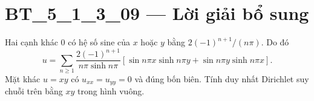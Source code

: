 \documentclass[10pt,a4paper]{article}
\begin{document}
\section*{BT\_5\_1\_3\_09 — Lời giải bổ sung}
Hai cạnh khác 0 có hệ số sine của $x$ hoặc $y$ bằng $2(-1)^{n+1}/(n\pi)$. Do đó
\[u=\sum_{n\ge1}\frac{2(-1)^{n+1}}{n\pi\sinh n\pi}[\sin n\pi x\sinh n\pi y+\sin n\pi y\sinh n\pi x].\]
Mặt khác $u=xy$ có $u_{xx}=u_{yy}=0$ và đúng bốn biên. Tính duy nhất Dirichlet suy chuỗi trên bằng $xy$ trong hình vuông.
\end{document}
